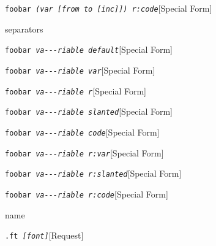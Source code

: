 \documentclass{book}
\begin{document}
%
\noindent\texttt{foobar \EmbracOn{}\textsl{(var \EmbracOff{}\textnormal{\texttt{[}}\EmbracOn{}from to \EmbracOff{}\textnormal{\texttt{[}}\EmbracOn{}inc\EmbracOff{}\textnormal{\texttt{]]}}\EmbracOn{}) r:code}}\hfill[Special Form]



%
separators

\noindent\texttt{foobar \EmbracOn{}\textsl{va{-}{-}{-}riable default}}\hfill[Special Form]



%
\noindent\texttt{foobar \EmbracOn{}\textsl{\EmbracOff{}\textsl{va{-}{-}{-}riable}\EmbracOn{} var}}\hfill[Special Form]



%
\noindent\texttt{foobar \EmbracOn{}\textsl{\EmbracOff{}\textnormal{va{-}{-}{-}riable}\EmbracOn{} r}}\hfill[Special Form]



%
\noindent\texttt{foobar \EmbracOn{}\textsl{\EmbracOff{}\textsl{va{-}{-}{-}riable}\EmbracOn{} slanted}}\hfill[Special Form]



%
\noindent\texttt{foobar \EmbracOn{}\textsl{\EmbracOff{}\texttt{va{-}{-}{-}riable}\EmbracOn{} code}}\hfill[Special Form]



%
\noindent\texttt{foobar \EmbracOn{}\textsl{\EmbracOff{}\textnormal{\textsl{va{-}{-}{-}riable}}\EmbracOn{} r:var}}\hfill[Special Form]



%
\noindent\texttt{foobar \EmbracOn{}\textsl{\EmbracOff{}\textnormal{\textsl{va{-}{-}{-}riable}}\EmbracOn{} r:slanted}}\hfill[Special Form]



%
\noindent\texttt{foobar \EmbracOn{}\textsl{\EmbracOff{}\textnormal{\texttt{va{-}{-}{-}riable}}\EmbracOn{} r:code}}\hfill[Special Form]



%
name

\noindent\texttt{\texttt{.ft} \EmbracOn{}\textsl{[\EmbracOff{}\textnormal{\textsl{font}}\EmbracOn{}]}}\hfill[Request]
\end{document}
